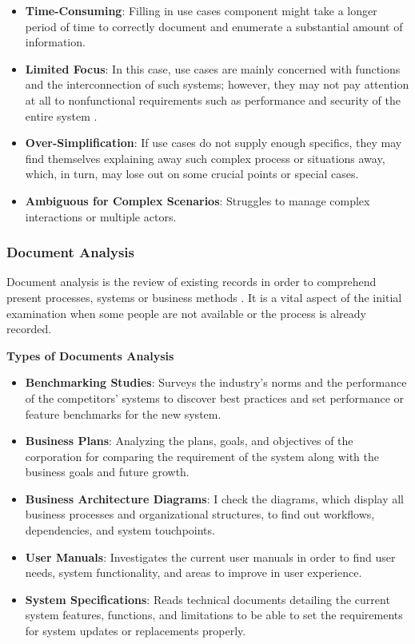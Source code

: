 \documentclass[conference]{IEEEtran}
\begin{document}
\begin{itemize}
    \item \textbf{Time-Consuming}: Filling in use cases component might take a longer period of time to correctly document and enumerate a substantial amount of information.
    \item \textbf{Limited Focus}: In this case, use cases are mainly concerned with functions and the interconnection of such systems; however, they may not pay attention at all to nonfunctional requirements such as performance and security of the entire system \cite{cite6}.
    \item \textbf{Over-Simplification}: If use cases do not supply enough specifics, they may find themselves explaining away such complex process or situations away, which, in turn, may lose out on some crucial points or special cases.
    \item \textbf{Ambiguous for Complex Scenarios}: Struggles to manage complex interactions or multiple actors.
\end{itemize}

\subsubsection{Document Analysis}

Document analysis is the review of existing records in order to comprehend present processes, systems or business methods \cite{cite13}. It is a vital aspect of the initial examination when some people are not available or the process is already recorded.

\textbf{Types of Documents Analysis}

\begin{itemize}
    \item \textbf{Benchmarking Studies}: Surveys the industry's norms and the performance of the competitors' systems to discover best practices and set performance or feature benchmarks for the new system.
    \item \textbf{Business Plans}: Analyzing the plans, goals, and objectives of the corporation for comparing the requirement of the system along with the business goals and future growth.
    \item \textbf{Business Architecture Diagrams}: I check the diagrams, which display all business processes and organizational structures, to find out workflows, dependencies, and system touchpoints.
    \item \textbf{User Manuals}: Investigates the current user manuals in order to find user needs, system functionality, and areas to improve in user experience.
    \item \textbf{System Specifications}: Reads technical documents detailing the current system features, functions, and limitations to be able to set the requirements for system updates or replacements properly.
\end{itemize}
\end{document}
